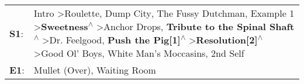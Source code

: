 \begin{supertabular}{p{0.03\textwidth}p{0.92\textwidth}}
 \textbf{S1}:  &  Intro\textsuperscript{} \textgreater \enspace Roulette\textsuperscript{}, \enspace Dump City\textsuperscript{}, \enspace The Fussy Dutchman\textsuperscript{}, \enspace Example 1\textsuperscript{} \textgreater \enspace \textbf{Sweetness\textsuperscript{$\wedge$}} \textgreater \enspace Anchor Drops\textsuperscript{}, \enspace \textbf{Tribute to the Spinal Shaft\textsuperscript{$\wedge$}} \textgreater \enspace Dr. Feelgood\textsuperscript{}, \enspace \textbf{Push the Pig[1]\textsuperscript{$\wedge$}} \textgreater \enspace \textbf{Resolution[2]\textsuperscript{$\wedge$}} \textgreater \enspace Good Ol' Boys\textsuperscript{}, \enspace White Man's Moccasins\textsuperscript{}, \enspace 2nd Self\textsuperscript{}  \enspace  \\
 \textbf{E1}:  &                                                                                                                                                                                                                                                                                                                                                                                                                                                                                                                                                                                                                                                                    Mullet (Over)\textsuperscript{}, \enspace Waiting Room\textsuperscript{}  \enspace  \\
\end{supertabular}
